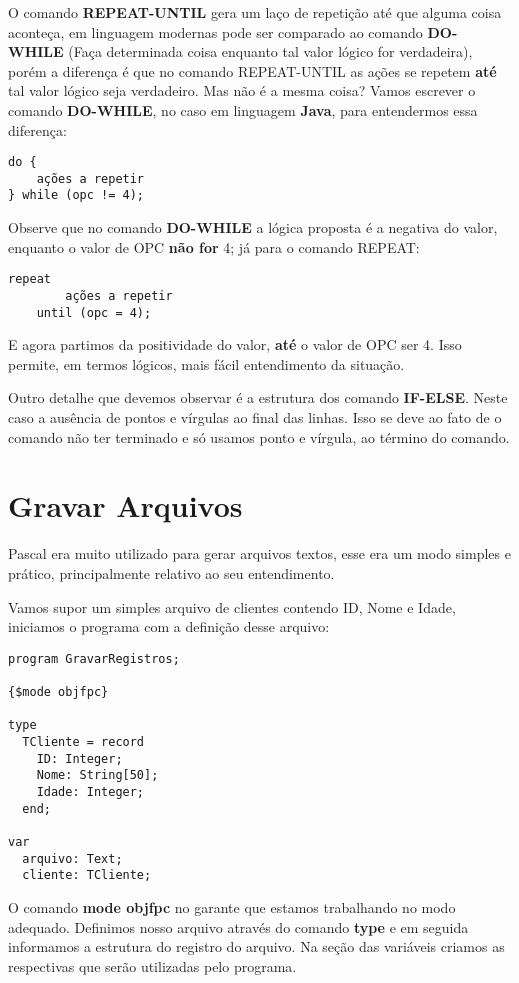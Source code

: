 O comando \textbf{REPEAT-UNTIL} gera um laço de repetição até que alguma coisa aconteça, em linguagem modernas pode ser comparado ao comando \textbf{DO-WHILE} (Faça determinada coisa enquanto tal valor lógico for verdadeira), porém a diferença é que no comando REPEAT-UNTIL as ações se repetem \textbf{até} tal valor lógico seja verdadeiro. Mas não é a mesma coisa? Vamos escrever o comando \textbf{DO-WHILE}, no caso em linguagem \textbf{Java}, para entendermos essa diferença:
\begin{lstlisting}[]
do {
	ações a repetir
} while (opc != 4);
\end{lstlisting}

Observe que no comando \textbf{DO-WHILE} a lógica proposta é a negativa do valor, enquanto o valor de OPC \textbf{não for} 4; já para o comando REPEAT:
\begin{lstlisting}[]
	repeat
		ações a repetir
	until (opc = 4);
\end{lstlisting}

E agora partimos da positividade do valor, \textbf{até} o valor de OPC ser 4. Isso permite, em termos lógicos, mais fácil entendimento da situação.

Outro detalhe que devemos observar é a estrutura dos comando \textbf{IF-ELSE}. Neste caso a ausência de pontos e vírgulas ao final das linhas. Isso se deve ao fato de o comando não ter terminado e só usamos ponto e vírgula, ao término do comando.

\section{Gravar Arquivos}
Pascal era muito utilizado para gerar arquivos textos, esse era um modo simples e prático, principalmente relativo ao seu entendimento.

Vamos supor um simples arquivo de clientes contendo ID, Nome e Idade, iniciamos o programa com a definição desse arquivo:
\begin{lstlisting}[]
program GravarRegistros;

{$mode objfpc}

type
  TCliente = record
    ID: Integer;
    Nome: String[50];
    Idade: Integer;
  end;	

var
  arquivo: Text;
  cliente: TCliente;
\end{lstlisting}

O comando \textbf{mode objfpc} no garante que estamos trabalhando no modo adequado. Definimos nosso arquivo através do comando \textbf{type} e em seguida informamos a estrutura do registro do arquivo. Na seção das variáveis criamos as respectivas que serão utilizadas pelo programa.

